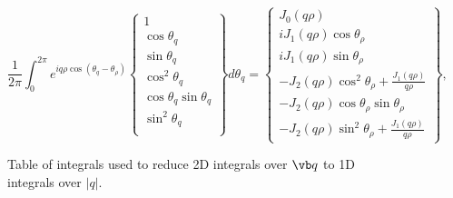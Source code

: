 \documentclass[letterpaper]{article}
\begin{document}
\begin{figure}
$$
 \frac{1}{2\pi} 
 \int_0^{2\pi} e^{i q \rho \cos(\theta_q -\theta_\rho)}
 \left\{\begin{array}{c}
 1 \\[5pt]
 \cos\theta_q \\[5pt]
 \sin\theta_q \\[5pt]
 \cos^2\theta_q \\[5pt]
 \cos\theta_q \sin\theta_q \\[5pt]
 \sin^2\theta_q \\
 \end{array}\right\}
 d\theta_q 
= \left\{ \begin{array}{l}
    J_0 (q\rho)                           \\[5pt]
    i J_1(q\rho) \cos \theta_\rho          \\[5pt]
    i J_1(q\rho) \sin \theta_\rho          \\[5pt]
    - J_2(q\rho) \cos^2\theta_\rho + \frac{J_1(q\rho)}{q\rho} \\[5pt]
    -J_2(q\rho) \cos\theta_\rho \sin \theta_\rho              \\[5pt]
    - J_2(q\rho) \sin^2 \theta_\rho + \frac{J_1(q\rho)}{q\rho} 
  \end{array}\right\},
$$
\caption{Table of integrals used to reduce 2D integrals over $\vb q$ to
         1D integrals over $|q|$.}
\label{BesselIntegralTable}
\end{figure}
\end{document}
